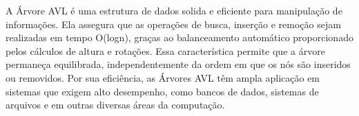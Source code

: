 \vspace{3mm}

A Árvore AVL é uma estrutura de dados solida e eficiente para manipulação de informações. 
Ela assegura que as operações de busca, inserção e remoção sejam realizadas em tempo 
O(logn), graças ao balanceamento automático proporcionado pelos cálculos de altura e rotações. 
Essa característica permite que a árvore permaneça equilibrada, independentemente da ordem em que os nós são inseridos ou removidos. 
Por sua eficiência, as Árvores AVL têm ampla aplicação em sistemas que exigem alto desempenho,
como bancos de dados, sistemas de arquivos e em outras diversas áreas da computação.